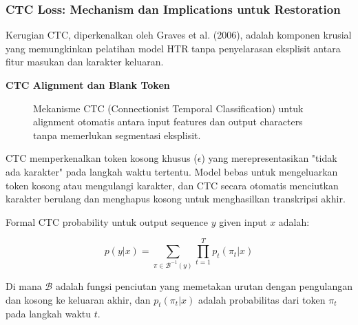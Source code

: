 \documentclass[12pt,a4paper]{article}
\begin{document}
\subsubsection{CTC Loss: Mechanism dan Implications untuk Restoration}
\label{subsubsec:ctc-loss}

Kerugian CTC, diperkenalkan oleh Graves et al. (2006), adalah komponen krusial yang memungkinkan pelatihan model HTR tanpa penyelarasan eksplisit antara fitur masukan dan karakter keluaran.

\textbf{CTC Alignment dan Blank Token}

\begin{figure}[H]
\centering
\caption{Mekanisme CTC (Connectionist Temporal Classification) untuk alignment otomatis antara input features dan output characters tanpa memerlukan segmentasi eksplisit.}
\label{fig:ctc-mechanism}
\end{figure}

CTC memperkenalkan token kosong khusus ($\epsilon$) yang merepresentasikan "tidak ada karakter" pada langkah waktu tertentu. Model bebas untuk mengeluarkan token kosong atau mengulangi karakter, dan CTC secara otomatis menciutkan karakter berulang dan menghapus kosong untuk menghasilkan transkripsi akhir.

Formal CTC probability untuk output sequence $y$ given input $x$ adalah:

\begin{equation}
p(y|x) = \sum_{\pi \in \mathcal{B}^{-1}(y)} \prod_{t=1}^T p_t(\pi_t|x)
\end{equation}

Di mana $\mathcal{B}$ adalah fungsi penciutan yang memetakan urutan dengan pengulangan dan kosong ke keluaran akhir, dan $p_t(\pi_t|x)$ adalah probabilitas dari token $\pi_t$ pada langkah waktu $t$.
\end{document}
